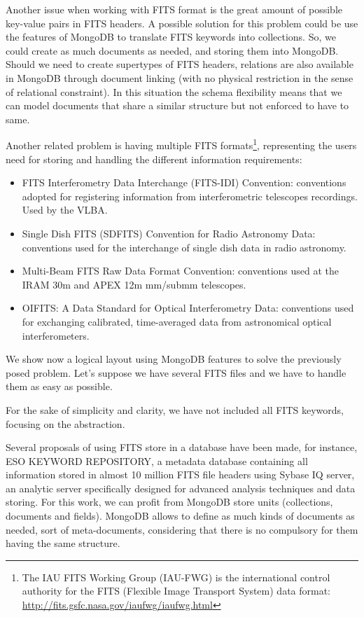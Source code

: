 Another issue when working with FITS format is the great amount of possible key-value pairs in FITS headers. A possible solution for this problem could be use the features of MongoDB to translate FITS keywords into collections. So, we could create as much documents as needed, and storing them into MongoDB. Should we need to create supertypes of FITS headers, relations are also available in MongoDB through document linking (with no physical restriction in the sense of relational constraint). In this situation the schema flexibility means that we can model documents that share a similar structure but not enforced to have to same.

Another related problem is having multiple FITS formats\footnote{The IAU FITS Working Group (IAU-FWG) is the international control authority for the FITS (Flexible Image Transport System) data format: \url{http://fits.gsfc.nasa.gov/iaufwg/iaufwg.html}}, representing the users need for storing and handling the different information requirements:

\begin{itemize}
\item FITS Interferometry Data Interchange (FITS-IDI) Convention: conventions adopted for registering information from interferometric telescopes recordings. Used by the VLBA.
\item Single Dish FITS (SDFITS) Convention for Radio Astronomy Data: conventions used for the interchange of single dish data in radio astronomy. 
\item Multi-Beam FITS Raw Data Format Convention: conventions used at the IRAM 30m and APEX 12m mm/submm telescopes.
\item OIFITS: A Data Standard for Optical Interferometry Data: conventions used for exchanging calibrated, time-averaged data from astronomical optical interferometers.
\end{itemize}


We show now a logical layout using MongoDB features to solve the previously posed problem. Let's suppose we have several FITS files and we have to handle them as easy as possible.

For the sake of simplicity and clarity, we have not included all FITS keywords, focusing on the abstraction.

Several proposals of using FITS store in a database have been made, for instance, ESO KEYWORD REPOSITORY, a metadata database containing all information stored in almost 10 million FITS file headers using Sybase IQ server, an analytic server specifically designed for advanced analysis techniques and data storing. For this work, we can profit from MongoDB store units (collections, documents and fields). MongoDB allows to define as much kinds of documents as needed, sort of meta-documents, considering that there is no compulsory for them having the same structure. 

